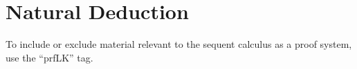 \documentclass[../../../include/open-logic-chapter]{subfiles}
\begin{document}
\chapter{Natural Deduction}

\begin{editorial}
  To include or exclude material relevant to the sequent calculus as a
  proof system, use the ``prfLK'' tag.
\end{editorial}







\OLEndChapterHook
\end{document}
